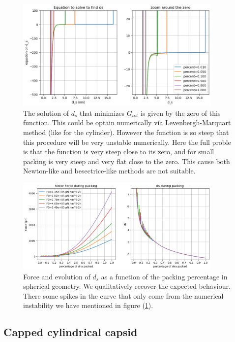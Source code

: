 \documentclass{article}
\begin{document}
\begin{figure}[H]
    \centering
    \includegraphics[width=0.9\textwidth]{Fig_Eq_sphere.png}
    \caption{The solution of $d_s$ that minimizes $G_{tot}$ is given by the zero of this function. This could be optain numerically via Levenbergh-Marquart method (like for the cylinder). However the function is so steep that this procedure will be very unstable numerically. Here the full proble is that the function is very steep close to its zero, and for small packing is very steep and very flat close to the zero. This cause both Newton-like and besectrice-like methods are not suitable.}
    \label{fig:eq-ds-sphere}
\end{figure}

\begin{figure}[H]
    \centering
    \includegraphics[width=0.9\textwidth]{Fig_ds_sphere.png}
    \caption{Force and evolution of $d_s$ as a function of the packing percentage in spherical geometry. We qualitatively recover the expected behaviour. There some spikes in the curve that only come from the numerical instability we have mentioned in figure (\ref{fig:eq-ds-sphere}).}
    \label{fig:force-sphere}
\end{figure}




\subsection{Capped cylindrical capsid}
\end{document}
